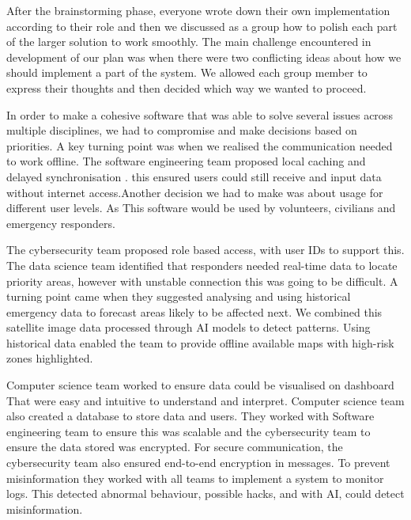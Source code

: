 \documentclass[a4paper, 11pt]{report}
\begin{document}
After the brainstorming phase, everyone wrote down their own implementation according to their role and then we discussed as a group how to polish each part of the larger solution to work smoothly. The main challenge encountered in development of our plan was when there were two conflicting ideas about how we should implement a part of the system. We allowed each group member to express their thoughts and then decided which way we wanted to proceed.\newline

In order to make a cohesive software that was able to solve several 
issues across multiple disciplines, we had to compromise and make decisions based on priorities. A key turning point was when we realised the communication needed to work offline. The software engineering team proposed local caching and delayed synchronisation . this ensured users could still receive and input data without internet access.Another decision we had to make was about usage for different user levels. As This software would be used by volunteers, civilians and emergency responders.\newline

The cybersecurity team proposed role based access, with user IDs to support this. The data science team identified that responders needed real-time data to locate priority areas, however with unstable connection this was going to be difficult. A turning point came when they suggested analysing and using historical emergency data to forecast areas likely to be affected next. We combined this satellite image data processed through AI models to detect patterns. Using historical data enabled the team to provide offline available maps with high-risk zones highlighted.\newline

Computer science team worked to ensure data could be visualised on dashboard
That were easy and intuitive to understand and interpret. Computer science team also created a database to store data and users. They worked with Software engineering team to ensure this was scalable and the cybersecurity team to ensure the data stored was encrypted. For secure communication, the cybersecurity team also ensured end-to-end encryption in messages. To prevent misinformation they worked with all teams to implement a system to monitor logs. This detected abnormal behaviour, possible hacks, and with AI, could detect misinformation. 
\end{document}
